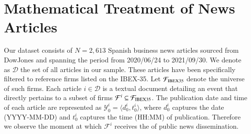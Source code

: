 \section{Mathematical Treatment of News Articles}

Our dataset consists of $N=2,613$ Spanish business news articles 
 sourced from DowJones and spanning the period from 2020/06/24 to 2021/09/30. 
 We denote as $\mathcal D$ the set of all articles in our sample.
 These articles have been specifically filtered to reference firms listed on the IBEX-35.
 Let $\mathcal{F}_{\text{IBEX35}}$ denote the universe of such firms. 
 Each article $i \in \mathcal{D}$ is a textual document detailing an event that directly pertains to a subset of firms $\mathcal{F}^i \subseteq \mathcal{F}_{\text{IBEX35}}$.
%
The publication date and time of each article are represented as $\mathcal{Y}_0^i = \langle d_0^i, t_0^i \rangle$, where $d_0^i$ captures the date 
(YYYY-MM-DD) 
and $t_0^i$ captures the time
 (HH:MM) 
 of publication. 
Therefore we observe
the moment at which $\mathcal{F}^i$ receives the  of public news dissemination. 

%

